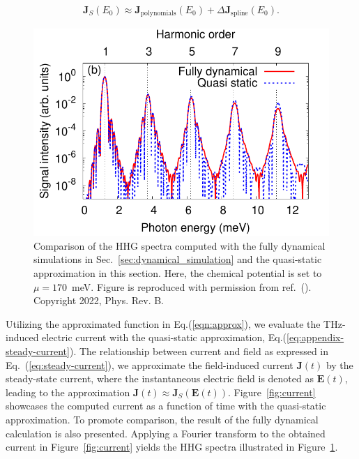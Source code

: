 \begin{align}
	\mathbf J_S(E_0)\approx \mathbf{J}_{\mathrm{polynomials }}(E_0)+\Delta \mathbf{J}_{\mathrm{spline}}(E_0).
	\label{eqn:approx}
\end{align}

\begin{figure}[htbp]
	\centering
	\includegraphics[width=0.8\linewidth]{pic/hhg_qstatic.pdf}
	\caption{\label{fig:hhg_qstatic}
		Comparison of the HHG spectra computed with the fully dynamical simulations in Sec.~\ref{sec:dynamical_simulation} and the quasi-static approximation in this section. Here, the chemical potential is set to $\mu =170$~meV. Figure is reproduced with permission from ref.~(\cite{PhysRevB.106.024313}). Copyright 2022, Phys. Rev. B.}
\end{figure}

Utilizing the approximated function in Eq.(\ref{eqn:approx}), we evaluate the THz-induced electric
current with the quasi-static approximation, Eq.(\ref{eq:appendix-steady-current}).
The relationship between current and field as expressed in Eq.~(\ref{eq:steady-current}), we approximate the field-induced current $\mathbf J(t)$ by the steady-state current, where the instantaneous electric field is denoted as $\mathbf E(t)$, leading to the approximation $\mathbf J(t)\approx \mathbf J_S\left( \mathbf E(t) \right)$.
Figure~\ref{fig:current} showcases the computed current as a function of time with the quasi-static
approximation. To promote comparison, the result of the fully dynamical calculation is also
presented. Applying a Fourier transform to the obtained current in Figure~\ref{fig:current} yields
the \gls{HHG} spectra illustrated in Figure~\ref{fig:hhg_qstatic}.
